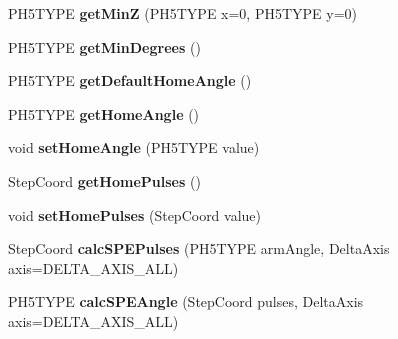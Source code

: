 \begin{DoxyCompactItemize}
\item 
\hypertarget{classfirestep_1_1_delta_calculator_a29460330bd2258f991d4396e7be8b8c4}{P\+H5\+T\+Y\+P\+E {\bfseries get\+Min\+Z} (P\+H5\+T\+Y\+P\+E x=0, P\+H5\+T\+Y\+P\+E y=0)}\label{classfirestep_1_1_delta_calculator_a29460330bd2258f991d4396e7be8b8c4}

\item 
\hypertarget{classfirestep_1_1_delta_calculator_af92d05c47560ffee3eb062853961ba8e}{P\+H5\+T\+Y\+P\+E {\bfseries get\+Min\+Degrees} ()}\label{classfirestep_1_1_delta_calculator_af92d05c47560ffee3eb062853961ba8e}

\item 
\hypertarget{classfirestep_1_1_delta_calculator_a2d74e9f0555a88ddc9c01f5e12999148}{P\+H5\+T\+Y\+P\+E {\bfseries get\+Default\+Home\+Angle} ()}\label{classfirestep_1_1_delta_calculator_a2d74e9f0555a88ddc9c01f5e12999148}

\item 
\hypertarget{classfirestep_1_1_delta_calculator_a278538fc24d3c88c8356027283e84919}{P\+H5\+T\+Y\+P\+E {\bfseries get\+Home\+Angle} ()}\label{classfirestep_1_1_delta_calculator_a278538fc24d3c88c8356027283e84919}

\item 
\hypertarget{classfirestep_1_1_delta_calculator_a9dbc638e38110a525f68af6d1120b789}{void {\bfseries set\+Home\+Angle} (P\+H5\+T\+Y\+P\+E value)}\label{classfirestep_1_1_delta_calculator_a9dbc638e38110a525f68af6d1120b789}

\item 
\hypertarget{classfirestep_1_1_delta_calculator_ae4f80ad737e48f252d8ee833ac908dfd}{Step\+Coord {\bfseries get\+Home\+Pulses} ()}\label{classfirestep_1_1_delta_calculator_ae4f80ad737e48f252d8ee833ac908dfd}

\item 
\hypertarget{classfirestep_1_1_delta_calculator_ab0882ea0d0a0cbaca87c7c34f9db03f8}{void {\bfseries set\+Home\+Pulses} (Step\+Coord value)}\label{classfirestep_1_1_delta_calculator_ab0882ea0d0a0cbaca87c7c34f9db03f8}

\item 
\hypertarget{classfirestep_1_1_delta_calculator_a513a143e53a1bd7e19a5849d1f11aa77}{Step\+Coord {\bfseries calc\+S\+P\+E\+Pulses} (P\+H5\+T\+Y\+P\+E arm\+Angle, Delta\+Axis axis=D\+E\+L\+T\+A\+\_\+\+A\+X\+I\+S\+\_\+\+A\+L\+L)}\label{classfirestep_1_1_delta_calculator_a513a143e53a1bd7e19a5849d1f11aa77}

\item 
\hypertarget{classfirestep_1_1_delta_calculator_ae15f0a5c48e8a74e23a5f6463368da95}{P\+H5\+T\+Y\+P\+E {\bfseries calc\+S\+P\+E\+Angle} (Step\+Coord pulses, Delta\+Axis axis=D\+E\+L\+T\+A\+\_\+\+A\+X\+I\+S\+\_\+\+A\+L\+L)}\label{classfirestep_1_1_delta_calculator_ae15f0a5c48e8a74e23a5f6463368da95}


\end{DoxyCompactItemize}
